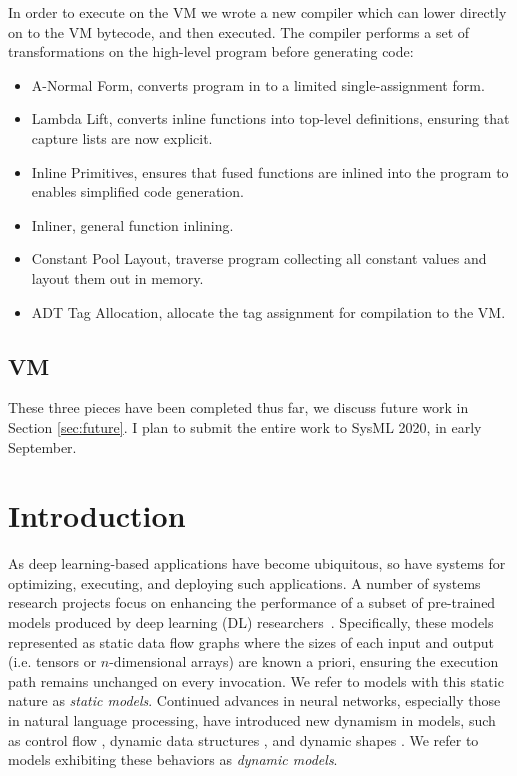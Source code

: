 In order to execute on the VM we wrote a new compiler which
  can lower \relay directly on to the VM bytecode, and then
  executed.
The compiler performs a set of transformations on the high-level
  \relay program before generating code:
\begin{itemize}
  \item A-Normal Form, converts program in to a limited single-assignment form.
  \item Lambda Lift, converts inline functions into top-level definitions,
        ensuring that capture lists are now explicit.
  \item Inline Primitives, ensures that fused functions are inlined into
        the program to enables simplified code generation.
  \item Inliner, general function inlining.
  \item Constant Pool Layout, traverse program collecting all constant values
        and layout them out in memory.
  \item ADT Tag Allocation, allocate the tag assignment for compilation
        to the VM.
\end{itemize}

\subsection{VM}

These three pieces have been completed thus far, we discuss future work in Section
\ref{sec:future}. I plan to submit the entire work to SysML 2020, in early September.


\section{Introduction}
\label{sec:nimble-intro}

As deep learning-based applications have become ubiquitous, so have systems for optimizing, executing, and deploying such applications. A number of systems research projects focus on enhancing the performance of a subset of pre-trained models produced by deep learning (DL) researchers~\citep{Dahl2011taslp, yu2011improved, han2016isca, NIPS2016johnson}.
Specifically, these models represented as static data flow graphs where the sizes of each input and output (i.e. tensors or $n$-dimensional arrays) are known a priori, ensuring the execution path remains unchanged on every invocation.
We refer to models with this static nature as \emph{static models}.
Continued advances in neural networks, especially those in natural language processing, have introduced new dynamism in models, such as control flow \citep{lstm, language_model}, dynamic data structures \citep{tree_lstm, graph_lstm}, and dynamic shapes \citep{devlin2018bert}. We refer to models exhibiting these behaviors as {\em dynamic models}.

